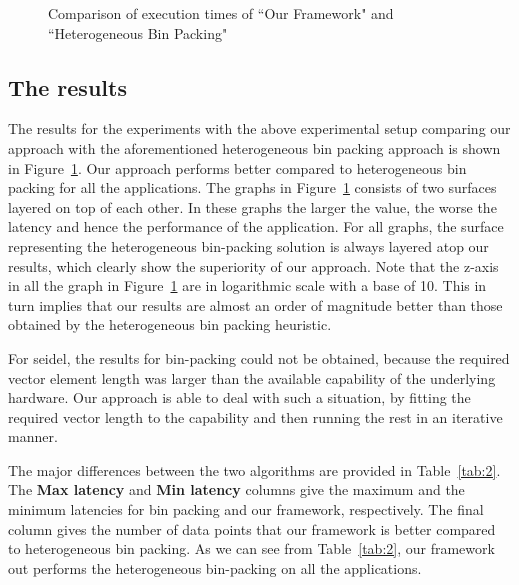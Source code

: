 \begin{figure}[t!]
{    \label{fig:jacl1ho}
  }
  \caption{Comparison of execution times of ``Our Framework" and
    ``Heterogeneous Bin Packing"}
  \label{fig:ho}
\end{figure}

\subsection{The results}
\label{sec:results-1}

The results for the experiments with the above experimental setup
comparing our approach with the aforementioned heterogeneous bin packing
approach is shown in Figure~\ref{fig:ho}. Our approach performs better
compared to heterogeneous bin packing for all the applications. The
graphs in Figure~\ref{fig:ho} consists of two surfaces layered on top of
each other. In these graphs the larger the value, the worse the latency
and hence the performance of the application. For all graphs, the
surface representing the heterogeneous bin-packing solution is always
layered atop our results, which clearly show the superiority of our
approach. Note that the z-axis in all the graph in Figure~\ref{fig:ho}
are in logarithmic scale with a base of 10. This in turn implies that
our results are almost an order of magnitude better than those obtained
by the heterogeneous bin packing heuristic.

For seidel, the results for bin-packing could not be obtained, because
the required vector element length was larger than the available
capability of the underlying hardware. Our approach is able to deal with
such a situation, by fitting the required vector length to the
capability and then running the rest in an iterative manner.

The major differences between the two algorithms are provided in
Table~\ref{tab:2}. The \textbf{Max latency} and \textbf{Min latency}
columns give the maximum and the minimum latencies for bin packing and
our framework, respectively. The final column gives the number of data
points that our framework is better compared to heterogeneous bin
packing. As we can see from Table~\ref{tab:2}, our framework out
performs the heterogeneous bin-packing on all the applications.

